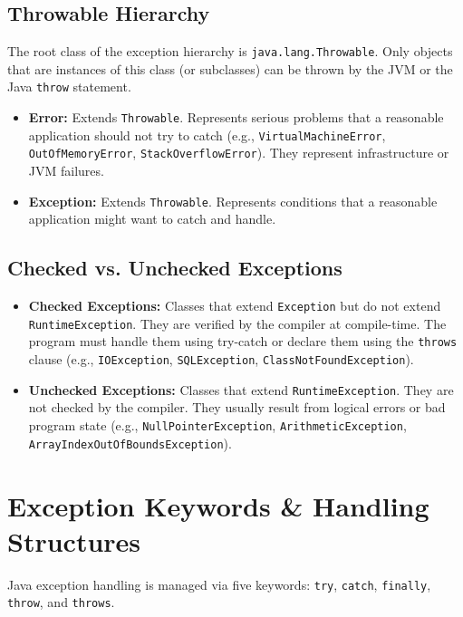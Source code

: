 \documentclass[12pt,a4paper]{article}
\begin{document}
\subsection{Throwable Hierarchy}
The root class of the exception hierarchy is \texttt{java.lang.Throwable}. Only objects that are instances of this class (or subclasses) can be thrown by the JVM or the Java \texttt{throw} statement.
\begin{itemize}[leftmargin=*, itemsep=3.5pt]
  \item \textbf{Error:} Extends \texttt{Throwable}. Represents serious problems that a reasonable application should not try to catch (e.g., \texttt{VirtualMachineError}, \texttt{OutOfMemoryError}, \texttt{StackOverflowError}). They represent infrastructure or JVM failures.
  \item \textbf{Exception:} Extends \texttt{Throwable}. Represents conditions that a reasonable application might want to catch and handle.
\end{itemize}

\subsection{Checked vs. Unchecked Exceptions}
\begin{itemize}[leftmargin=*, itemsep=4pt]
  \item \textbf{Checked Exceptions:} Classes that extend \texttt{Exception} but do not extend \texttt{RuntimeException}. They are verified by the compiler at compile-time. The program must handle them using try-catch or declare them using the \texttt{throws} clause (e.g., \texttt{IOException}, \texttt{SQLException}, \texttt{ClassNotFoundException}).
  \item \textbf{Unchecked Exceptions:} Classes that extend \texttt{RuntimeException}. They are not checked by the compiler. They usually result from logical errors or bad program state (e.g., \texttt{NullPointerException}, \texttt{ArithmeticException}, \texttt{ArrayIndexOutOfBoundsException}).
\end{itemize}

\section{Exception Keywords \& Handling Structures}

Java exception handling is managed via five keywords: \texttt{try}, \texttt{catch}, \texttt{finally}, \texttt{throw}, and \texttt{throws}.
\end{document}
